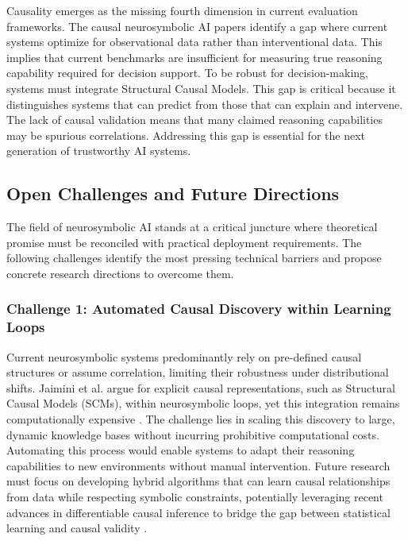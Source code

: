 \documentclass{article}
\begin{document}
Causality emerges as the missing fourth dimension in current evaluation frameworks. The causal neurosymbolic AI papers identify a gap where current systems optimize for observational data rather than interventional data. This implies that current benchmarks are insufficient for measuring true reasoning capability required for decision support. To be robust for decision-making, systems must integrate Structural Causal Models. This gap is critical because it distinguishes systems that can predict from those that can explain and intervene. The lack of causal validation means that many claimed reasoning capabilities may be spurious correlations. Addressing this gap is essential for the next generation of trustworthy AI systems.

\subsection{Open Challenges and Future Directions}

\label{sec:open_challenges_and_future_directions}

The field of neurosymbolic AI stands at a critical juncture where theoretical promise must be reconciled with practical deployment requirements. The following challenges identify the most pressing technical barriers and propose concrete research directions to overcome them.

\subsubsection{Challenge 1: Automated Causal Discovery within Learning Loops}

\label{sec:challenge_1_automated_causal_discovery_w}

Current neurosymbolic systems predominantly rely on pre-defined causal structures or assume correlation, limiting their robustness under distributional shifts. Jaimini et al. argue for explicit causal representations, such as Structural Causal Models (SCMs), within neurosymbolic loops, yet this integration remains computationally expensive \cite{jaimini2024causal}. The challenge lies in scaling this discovery to large, dynamic knowledge bases without incurring prohibitive computational costs. Automating this process would enable systems to adapt their reasoning capabilities to new environments without manual intervention. Future research must focus on developing hybrid algorithms that can learn causal relationships from data while respecting symbolic constraints, potentially leveraging recent advances in differentiable causal inference to bridge the gap between statistical learning and causal validity \cite{garcez2020neurosymbolic}.
\end{document}
